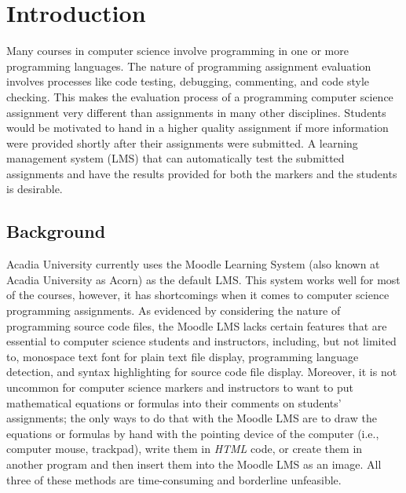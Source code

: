 

\chapter{Introduction}
\label{chap:INTRO}

Many courses in computer science involve programming in one or more programming
languages.
The nature of programming assignment evaluation
involves processes like code testing, debugging, commenting, and code style
checking.
This makes the evaluation process of a programming computer science assignment
very different than assignments in many other disciplines.
Students would be motivated to hand in a higher quality assignment
if more information were provided shortly after their assignments were
submitted.
A learning management system (LMS) that can automatically test the
submitted assignments and have the results provided for both the markers and
the students is desirable.

\section{Background}

Acadia University currently uses the Moodle Learning System (also known at 
Acadia University as Acorn) as the default LMS.
This system works well for most of the courses, however, it has shortcomings
when it comes to computer science programming assignments.
As evidenced by considering the nature of programming source code files,
the Moodle LMS lacks certain features that are essential to computer science
students and instructors,
including, but not limited to, monospace text font for plain text
file display, programming language detection, and syntax
highlighting for source code file display.
Moreover, it is not uncommon for computer science markers and instructors
to want to put mathematical equations or formulas into their comments on
students' assignments; the only ways to do that with the Moodle
LMS are to draw the equations or formulas by hand with the
pointing device of the computer (i.e., computer mouse, trackpad), write
them in \emph{HTML} code,
or create them in another program and then insert them into the Moodle LMS as an image.
All three of these methods are
time-consuming and borderline unfeasible.

\medskip

